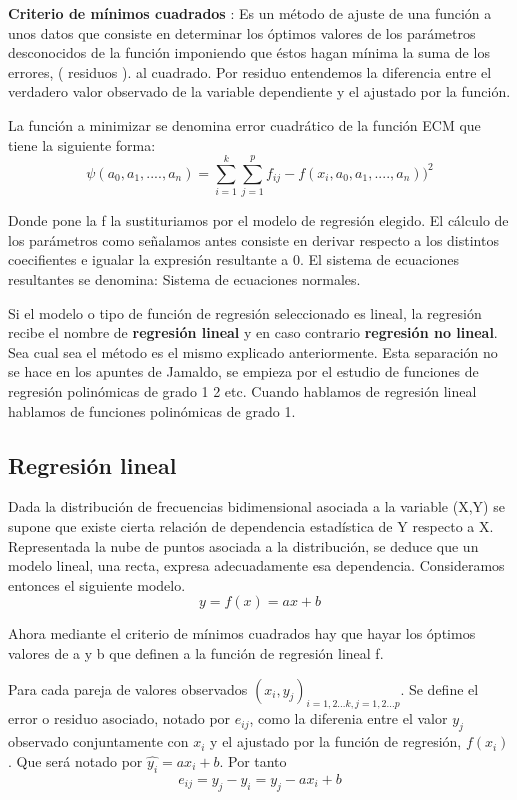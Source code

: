 \documentclass{article}
\begin{document}
	
	\textbf{Criterio de mínimos cuadrados} : Es un método de ajuste de una función a unos datos que consiste en determinar los óptimos valores de los parámetros desconocidos de la función imponiendo que éstos hagan mínima la suma de los errores, ( residuos ). al cuadrado. Por residuo entendemos la diferencia entre el verdadero valor observado de la variable dependiente y el ajustado por la función.
	\vspace{2mm}
	
	 La función a minimizar se denomina error cuadrático de la función ECM que tiene la siguiente forma:
	 $$\psi (a_0,a_1,....,a_n) = \sum_{i=1}^k \sum_{j=1}^p f_{ij} - f(x_i,a_0,a_1,....,a_n))^2 $$
	
	 Donde pone la f la sustituriamos por el modelo de regresión elegido. El cálculo de los parámetros como señalamos antes consiste en derivar respecto a los distintos coecifientes e igualar la expresión resultante a 0. El sistema de ecuaciones resultantes se denomina: Sistema de ecuaciones normales.
	\vspace{2mm}
	
	
	Si el modelo o tipo de función de regresión seleccionado es lineal, la regresión recibe el nombre de \textbf{regresión lineal} y en caso contrario \textbf{regresión no lineal}. Sea cual sea el método es el mismo explicado anteriormente. Esta separación no se hace en los apuntes de Jamaldo, se empieza por el estudio de funciones de regresión polinómicas de grado 1 2 etc. Cuando hablamos de regresión lineal hablamos de funciones polinómicas de grado 1.
	
	
	\subsection{Regresión lineal}
	
	Dada la distribución de frecuencias bidimensional asociada a la variable (X,Y) se supone que existe cierta relación de dependencia estadística de Y respecto a X. Representada la nube de puntos asociada a la distribución, se deduce que un modelo lineal, una recta, expresa adecuadamente esa dependencia. Consideramos entonces el siguiente modelo.
	$$ y = f(x) = ax + b $$
	
	Ahora mediante el criterio de mínimos cuadrados hay que hayar los óptimos valores de a y b que definen a la función de regresión lineal f.
	
	Para cada pareja de valores observados $(x_i,y_j)_{i=1,2...k, j=1,2...p}$. Se define el error o residuo asociado, notado por $e_{ij}$, como la diferenia entre el valor $y_j$ observado conjuntamente con $x_i$ y el ajustado por la función de regresión, $f(x_i)$. Que será notado por $\hat{y_i} = ax_i +b$.
	Por tanto $$e_{ij} = y_j - \hat{y_i} = y_j - ax_i + b $$
	
\end{document}

